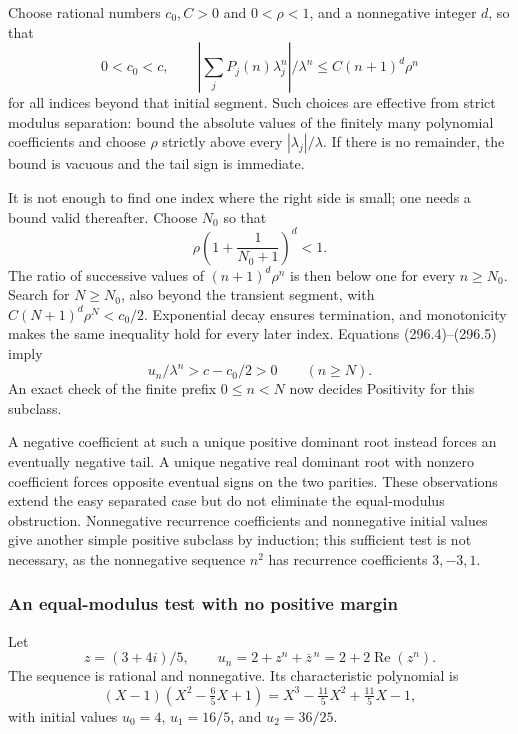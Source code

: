 \documentclass[11pt]{article}
\begin{document}
Choose rational numbers $c_0,C>0$ and $0<\rho<1$, and a nonnegative integer $d$, so that
\[
 0<c_0<c,\qquad
 \left|\sum_j P_j(n)\lambda_j^n\right|/\lambda^n
 \le C(n+1)^d\rho^n
 \tag{296.5}
\]
for all indices beyond that initial segment. Such choices are effective from strict modulus separation: bound the absolute values of the finitely many polynomial coefficients and choose $\rho$ strictly above every $|\lambda_j|/\lambda$. If there is no remainder, the bound is vacuous and the tail sign is immediate.

It is not enough to find one index where the right side is small; one needs a bound valid thereafter. Choose $N_0$ so that
\[
 \rho\left(1+\frac1{N_0+1}\right)^d<1.
\]
The ratio of successive values of $(n+1)^d\rho^n$ is then below one for every $n\ge N_0$. Search for $N\ge N_0$, also beyond the transient segment, with
$C(N+1)^d\rho^N<c_0/2$. Exponential decay ensures termination, and monotonicity makes the same inequality hold for every later index. Equations (296.4)--(296.5) imply
\[
 u_n/\lambda^n>c-c_0/2>0\qquad(n\ge N).
\]
An exact check of the finite prefix $0\le n<N$ now decides Positivity for this subclass.

A negative coefficient at such a unique positive dominant root instead forces an eventually negative tail. A unique negative real dominant root with nonzero coefficient forces opposite eventual signs on the two parities. These observations extend the easy separated case but do not eliminate the equal-modulus obstruction. Nonnegative recurrence coefficients and nonnegative initial values give another simple positive subclass by induction; this sufficient test is not necessary, as the nonnegative sequence $n^2$ has recurrence coefficients $3,-3,1$.

\subsubsection{An equal-modulus test with no positive margin}
Let
\[
 z=(3+4i)/5,\qquad u_n=2+z^n+\overline z^{\,n}=2+2\operatorname{Re}(z^n).
 \tag{296.6}
\]
The sequence is rational and nonnegative. Its characteristic polynomial is
\[
 (X-1)(X^2-\tfrac65X+1)
   =X^3-\tfrac{11}5X^2+\tfrac{11}5X-1,
\]
with initial values $u_0=4$, $u_1=16/5$, and $u_2=36/25$.
\end{document}
